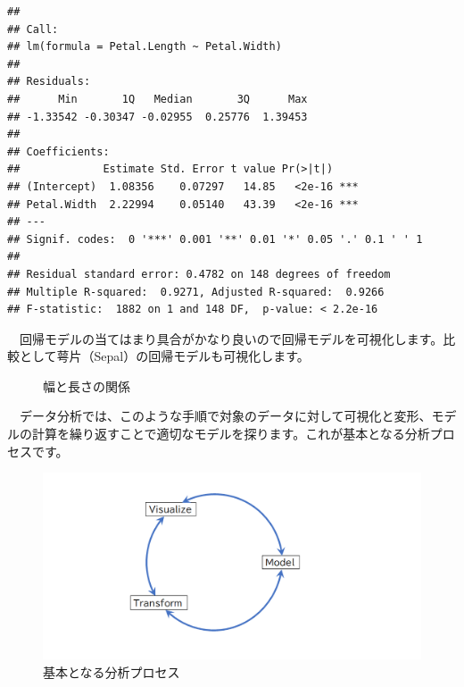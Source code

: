 \documentclass[
  12pt,
]{book}
\begin{document}
\begin{verbatim}
## 
## Call:
## lm(formula = Petal.Length ~ Petal.Width)
## 
## Residuals:
##      Min       1Q   Median       3Q      Max 
## -1.33542 -0.30347 -0.02955  0.25776  1.39453 
## 
## Coefficients:
##             Estimate Std. Error t value Pr(>|t|)    
## (Intercept)  1.08356    0.07297   14.85   <2e-16 ***
## Petal.Width  2.22994    0.05140   43.39   <2e-16 ***
## ---
## Signif. codes:  0 '***' 0.001 '**' 0.01 '*' 0.05 '.' 0.1 ' ' 1
## 
## Residual standard error: 0.4782 on 148 degrees of freedom
## Multiple R-squared:  0.9271, Adjusted R-squared:  0.9266 
## F-statistic:  1882 on 1 and 148 DF,  p-value: < 2.2e-16
\end{verbatim}

　回帰モデルの当てはまり具合がかなり良いので回帰モデルを可視化します。比較として萼片（Sepal）の回帰モデルも可視化します。

\begin{figure}[H]

{\centering {}

}

\caption{幅と長さの関係}\label{fig:unnamed-chunk-7}
\end{figure}

　データ分析では、このような手順で対象のデータに対して可視化と変形、モデルの計算を繰り返すことで適切なモデルを探ります。これが基本となる分析プロセスです。

\begin{figure}[H]

{\centering \includegraphics[width=0.9\linewidth,]{./fig/DSWF/data_science_workflow_step1} 

}

\caption{基本となる分析プロセス}\label{fig:unnamed-chunk-8}
\end{figure}
\end{document}
